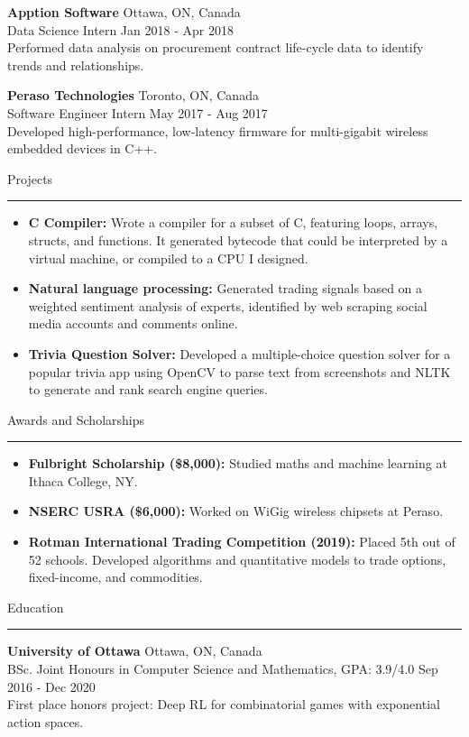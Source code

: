 \documentclass[12pt]{article}
\newcommand{\rSection}[1]{
    \medskip
    {\Large #1}
    \medskip
    \hrule
}
\newcommand{\rItem}[2]{
    \item \textbf{#1:} #2
    \vspace{-5pt}
}
\begin{document}
\textbf{Apption Software} \hfill Ottawa, ON, Canada\\
Data Science Intern \hfill Jan 2018 - Apr 2018\\
Performed data analysis on procurement contract life-cycle data to identify trends and relationships. 


\textbf{Peraso Technologies} \hfill Toronto, ON, Canada\\
Software Engineer Intern \hfill May 2017 - Aug 2017\\
Developed high-performance, low-latency firmware for multi-gigabit wireless embedded devices in C++.


\rSection{Projects}
\begin{itemize}[label={},leftmargin=0pt]
    \setlength\itemsep{0em}
    \rItem{C Compiler}{Wrote a compiler for a subset of C, featuring loops, arrays, structs, and functions. It generated bytecode that could be interpreted by a virtual machine, or compiled to a CPU I designed.}
    \rItem{Natural language processing}{Generated trading signals based on a weighted sentiment analysis of experts, identified by web scraping social media accounts and comments online.}
    \rItem{Trivia Question Solver}{Developed a multiple-choice question solver for a popular trivia app using OpenCV to parse text from screenshots and NLTK to generate and rank search engine queries.}
\end{itemize}


\rSection{Awards and Scholarships}
\begin{itemize}[label={},leftmargin=0pt]
    \rItem{Fulbright Scholarship (\$8,000)}{Studied maths and machine learning at Ithaca College, NY.}
    \rItem{NSERC USRA (\$6,000)} {Worked on WiGig wireless chipsets at Peraso.}
    \rItem{Rotman International Trading Competition (2019)} {Placed 5th out of 52 schools. Developed algorithms and quantitative models to trade options, fixed-income, and commodities.}
\end{itemize}



\rSection{Education}
\textbf{University of Ottawa} \hfill Ottawa, ON, Canada\\
BSc. Joint Honours in Computer Science and Mathematics, GPA: 3.9/4.0 \hfill Sep 2016 - Dec 2020\\
First place honors project: Deep RL for combinatorial games with exponential action spaces.
\vspace{-5pt}
\end{document}
